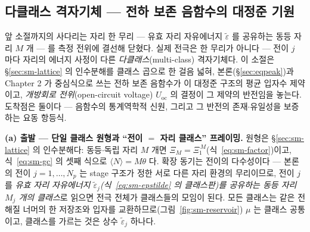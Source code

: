 
\subsection{다클래스 격자기체 --- 전하 보존 음함수의 대정준 기원}\label{sec:sm-mc}
앞 소절까지의 사다리는 자리 한 무리 --- 유효 자리 자유에너지 $\tilde\varepsilon$ 를 공유하는 동등 자리
$M$ 개 --- 를 측정 전위에 결선해 닫혔다. 실제 전극은 한 무리가 아니다 --- 전이 $j$ 마다 자리의 에너지
사정이 다른 \emph{다클래스}(multi-class) 격자기체다. 이 소절은 \S\ref{sec:sm-lattice} 의 인수분해를
클래스 곱으로 한 걸음 넓혀, 본론(\S\ref{sec:eqpeak})과 Chapter 2 가 중심식으로 쓰는 전하 보존
음함수가 이 대정준 구조의 평균 입자수 제약이고, \emph{개방회로 전위}(open-circuit voltage)
$U_{\mathrm{oc}}$ 의 결정이 그 제약의 반전임을 놓는다. 도착점은 둘이다 --- 음함수의 통계역학적 신원,
그리고 그 반전의 존재$\cdot$유일성을 보증하는 요동 항등식.

\textbf{(a) 출발 --- 단일 클래스 원형과 ``전이 $=$ 자리 클래스'' 프레이밍.} 원형은
\S\ref{sec:sm-lattice} 의 인수분해다: 동등$\cdot$독립 자리 $M$ 개면
$\Xi_M=\Xi_1^{\,M}$(식~\eqref{eq:sm-factor})이고, 식~\eqref{eq:sm-gc} 의 셋째 식으로
$\langle N\rangle=M\theta$ 다. 확장 동기는 전이의 다수성이다 --- 본론의 전이 $j=1,\dots,N_p$ 는 stage
구조가 정한 서로 다른 자리 환경의 무리이므로, 전이 $j$ 를 \emph{유효 자리 자유에너지
$\tilde\varepsilon_j$(식~\eqref{eq:sm-epstilde} 의 클래스판)를 공유하는 동등 자리 $M_j$ 개의 클래스}로
읽으면 전극 전체가 클래스들의 모임이 된다. 모든 클래스는 같은 전해질 너머의 한 저장조와 입자를
교환하므로(그림~\ref{fig:sm-reservoir}) $\mu$ 는 클래스 공통이고, 클래스를 가르는 것은 상수
$\tilde\varepsilon_j$ 하나다.

